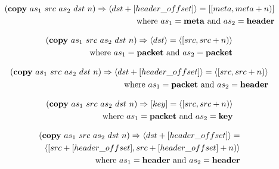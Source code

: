 \documentclass{article}
\begin{document}
\begin{equation}
\begin{split}
  (\textrm{\textbf{copy}} \ as_1 \ src \ as_2 \ dst \ n) \Rightarrow \langle
  dst + [header\_offset] \rangle = [[meta, meta + n)] \\ 
    \textrm{where} \ as_1 = \textrm{\textbf{meta} and } as_2 =
    \textrm{\textbf{header}}
\end{split}
\end{equation}

\begin{equation}
\begin{split}
  (\textrm{\textbf{copy}} \ as_1 \ src \ as_2 \ dst \ n) \Rightarrow \langle
  dst \rangle = \langle [src, src + n) \rangle \\ 
    \textrm{where} \ as_1 = \textrm{\textbf{packet} and } as_2 =
    \textrm{\textbf{packet}}
\end{split}
\end{equation}

\begin{equation}
\begin{split}
  (\textrm{\textbf{copy}} \ as_1 \ src \ as_2 \ dst \ n) \Rightarrow \langle
  dst + [header\_offset] \rangle =  \langle [src, src + n) \rangle \\ 
    \textrm{where} \ as_1 = \textrm{\textbf{packet} and } as_2 =
    \textrm{\textbf{header}}
\end{split}
\end{equation}

\begin{equation}
\begin{split}
  (\textrm{\textbf{copy}} \ as_1 \ src \ as_2 \ dst \ n) \Rightarrow [key] =
  \langle [src, src + n) \rangle \\ 
    \textrm{where} \ as_1 = \textrm{\textbf{packet} and } as_2 =
    \textrm{\textbf{key}}
\end{split}
\end{equation}

\begin{equation}
\begin{split}
  (\textrm{\textbf{copy}} \ as_1 \ src \ as_2 \ dst \ n) \Rightarrow \langle
  dst + [header\_offset] \rangle = \\
  \langle [src + [header\_offset], src + [header\_offset] + n) \rangle \\ 
    \textrm{where} \ as_1 = \textrm{\textbf{header} and } as_2 =
    \textrm{\textbf{header}}
\end{split}
\end{equation}
\end{document}
